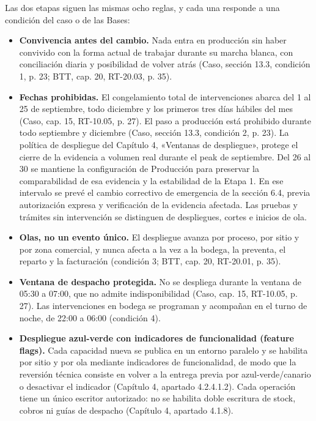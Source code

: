 Las dos etapas siguen las mismas ocho reglas, y cada una responde a una condición del caso o de las Bases:

\begin{itemize}
\item \textbf{Convivencia antes del cambio.} Nada entra en producción sin haber convivido con la forma actual de trabajar durante su marcha blanca, con conciliación diaria y posibilidad de volver atrás (Caso, sección 13.3, condición 1, p. 23; BTT, cap. 20, RT-20.03, p. 35).

\item \textbf{Fechas prohibidas.} El congelamiento total de intervenciones abarca del 1 al 25 de septiembre, todo diciembre y los primeros tres días hábiles del mes (Caso, cap. 15, RT-10.05, p. 27). El paso a producción está prohibido durante todo septiembre y diciembre (Caso, sección 13.3, condición 2, p. 23). La política de despliegue del Capítulo 4, «Ventanas de despliegue», protege el cierre de la evidencia a volumen real durante el peak de septiembre. Del 26 al 30 se mantiene la configuración de Producción para preservar la comparabilidad de esa evidencia y la estabilidad de la Etapa 1. En ese intervalo se prevé el cambio correctivo de emergencia de la sección 6.4, previa autorización expresa y verificación de la evidencia afectada. Las pruebas y trámites sin intervención se distinguen de despliegues, cortes e inicios de ola.

\item \textbf{Olas, no un evento único.} El despliegue avanza por proceso, por sitio y por zona comercial, y nunca afecta a la vez a la bodega, la preventa, el reparto y la facturación (condición 3; BTT, cap. 20, RT-20.01, p. 35).

\item \textbf{Ventana de despacho protegida.} No se despliega durante la ventana de 05:30 a 07:00, que no admite indisponibilidad (Caso, cap. 15, RT-10.05, p. 27). Las intervenciones en bodega se programan y acompañan en el turno de noche, de 22:00 a 06:00 (condición 4).

\item \textbf{Despliegue azul-verde con indicadores de funcionalidad (feature flags).} Cada capacidad nueva se publica en un entorno paralelo y se habilita por sitio y por ola mediante indicadores de funcionalidad, de modo que la reversión técnica consiste en volver a la entrega previa por azul-verde/canario o desactivar el indicador (Capítulo 4, apartado 4.2.4.1.2). Cada operación tiene un único escritor autorizado: no se habilita doble escritura de stock, cobros ni guías de despacho (Capítulo 4, apartado 4.1.8).


\end{itemize}
